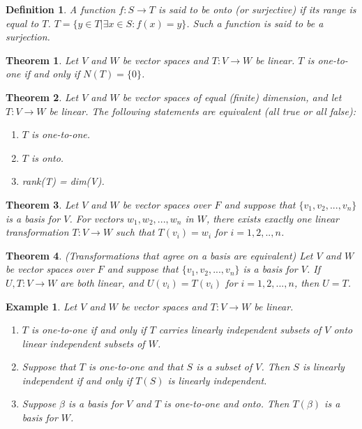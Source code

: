 \documentclass[a4paper]{article}
\newtheorem{mytheorem}{Theorem}
\newtheorem{example}{Example}
\newtheorem{mydef}{Definition}
\numberwithin{mytheorem}{section}
\numberwithin{mydef}{section}
\numberwithin{example}{section}
\begin{document}
\begin{mydef}  A function $f : S \rightarrow T$ is said to be onto (or surjective) if its range is equal to $T$. $T = \{ y \in T | \exists x \in S : f(x) = y \} $. Such a function is said to be a surjection.
\end{mydef}

\begin{mytheorem} Let $V$ and $W$ be vector spaces and $T: V \rightarrow W$ be linear. $T$ is one-to-one if and only if $N(T) = \{ 0 \}$.
\end{mytheorem}

\begin{mytheorem}Let $V$ and $W$ be vector spaces of equal (finite) dimension, and let $T: V \rightarrow W$ be linear. The following statements are equivalent (all true or all false):
\begin{enumerate}
\item $T$ is one-to-one.
\item $T$ is onto.
\item rank(T) = dim(V).
\end{enumerate}
\end{mytheorem}

\begin{mytheorem} Let $V$ and $W$ be vector spaces over $F$ and suppose that $\{ v_{1},v_{2},...,v_{n} \} $ is a basis for $V$. For vectors $w_{1},w_{2},...,w_{n}$ in $W$, there exists exactly one linear transformation $T: V \rightarrow W$ such that $T(v_{i}) = w_{i}$ for $i = 1,2,..,n$.
\end{mytheorem}

\begin{mytheorem} (Transformations that agree on a basis are equivalent) Let $V$ and $W$ be vector spaces over $F$ and suppose that $\{ v_{1},v_{2},...,v_{n} \} $ is a basis for $V$. If $U,T: V \rightarrow W$ are both linear, and $U(v_{i}) = T(v_{i})$ for $i = 1,2,...,n$, then $U = T$. 
\end{mytheorem}

\begin{example} Let $V$ and $W$ be vector spaces and $T: V \rightarrow W$ be linear. 
\begin{enumerate}
\item $T$ is one-to-one if and only if $T$ carries linearly independent subsets of $V$ onto linear independent subsets of $W$.
\item Suppose that $T$ is one-to-one and that $S$ is a subset of $V$. Then $S$ is linearly independent if and only if $T(S)$ is linearly independent.
\item Suppose $\beta$ is a basis for $V$ and $T$ is one-to-one and onto. Then $T(\beta)$ is a basis for $W$.
\end{enumerate}
\end{example}
\end{document}
